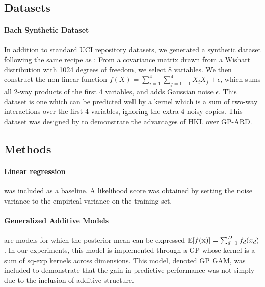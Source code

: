 \documentclass[twoside]{article}
\begin{document}
\subsection{Datasets}

\paragraph{Bach Synthetic Dataset}
In addition to standard UCI repository datasets, we generated a synthetic dataset following the same recipe as \cite{DBLP:journals/corr/abs-0909-0844}: From a covariance matrix drawn from a Wishart distribution with 1024 degrees of freedom, we select 8 variables.
We then construct the non-linear function $f(X) = \sum_{i=1}^4 \sum_{j=1+1}^4 X_i X_j + \epsilon$, which sums all 2-way products of the first 4 variables, and adds Gaussian noise $\epsilon$.
This dataset is one which can be predicted well by a kernel which is a sum of two-way interactions over the first 4 variables, ignoring the extra 4 noisy copies.
%
This dataset was designed by \cite{DBLP:journals/corr/abs-0909-0844} to demonstrate the advantages of HKL over GP-ARD. 


\subsection{Methods}

\paragraph{Linear regression} was included as a baseline. A likelihood score was obtained by setting the noise variance to the empirical variance on the training set.

\paragraph{Generalized Additive Models} are models for which the posterior mean can be expressed $\mathbb{E}[f({\bf{x}})] = \sum_{d=1}^D f_d(x_d)$.  
In our experiments, this model is implemented through a GP whose kernel is a sum of sq-exp kernels across dimensions.  
This model, denoted GP GAM, was included to demonstrate that the gain in predictive performance was not simply due to the inclusion of additive structure.
\end{document}
